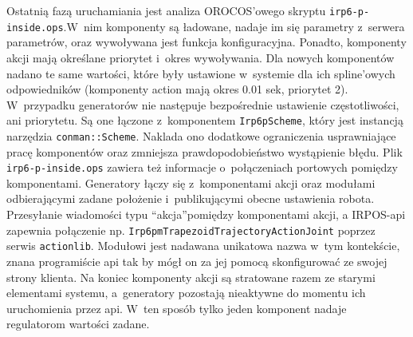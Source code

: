 \documentclass[a4paper, 12pt]{article}
\begin{document}
	Ostatnią fazą uruchamiania jest analiza OROCOS'owego skryptu \texttt{irp6-p-inside.ops}.\linebreak W~nim komponenty są ładowane, nadaje im się parametry z~serwera parametrów, oraz wywoływana jest funkcja konfiguracyjna. Ponadto, komponenty akcji mają określane priorytet i~okres wywoływania. Dla nowych komponentów nadano te same wartości, które były ustawione w~systemie dla ich spline'owych odpowiedników (komponenty action mają okres 0.01 sek, priorytet 2). W~przypadku generatorów nie następuje bezpośrednie ustawienie częstotliwości, ani priorytetu. Są one łączone z~komponentem \texttt{Irp6pScheme}, który jest instancją narzędzia \texttt{conman::Scheme}. Naklada ono dodatkowe ograniczenia usprawniające pracę komponentów oraz zmniejsza prawdopodobieństwo wystąpienie błędu. Plik \texttt{irp6-p-inside.ops} zawiera też informacje o~połączeniach portowych pomiędzy komponentami. Generatory łączy się z~komponentami akcji oraz modułami odbierającymi zadane położenie i~publikującymi obecne ustawienia robota. Przesyłanie wiadomości typu \textquotedblleft akcja\textquotedblright pomiędzy komponentami akcji, a IRPOS-api zapewnia połączenie np. \texttt{Irp6pmTrapezoidTrajectoryActionJoint} poprzez serwis \texttt{actionlib}.
	Modułowi jest nadawana unikatowa nazwa w~tym kontekście, znana programiście api tak by mógł on za jej pomocą skonfigurować ze swojej strony klienta. Na koniec komponenty akcji są stratowane razem ze starymi elementami systemu, a~generatory pozostają nieaktywne do momentu ich uruchomienia przez api. W~ten sposób tylko jeden komponent nadaje regulatorom wartości zadane.
	
\end{document}
